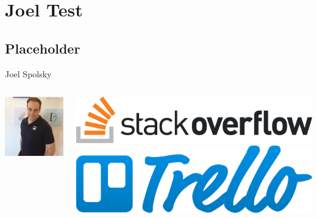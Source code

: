 \documentclass{beamer}
\begin{document}
\section{Joel Test}
\subsection{Placeholder}
\begin{frame}{Joel Spolsky}
	\begin{columns}[T] %
		\begin{column}{.49\textwidth}
			\vfill
			\begin{center}
				\includegraphics[scale=.25]{spolsky.jpeg}
			\end{center}
			\vfill
		\end{column}
		\hfill
		\begin{column}[t]{0.49\textwidth}
			\vfill
				\includegraphics[scale=.25]{so-logo.eps}
			\vfill
				\includegraphics[scale=.25]{trello-logo-blue.eps}

\end{column}
\end{columns}
\end{frame}
\end{document}
